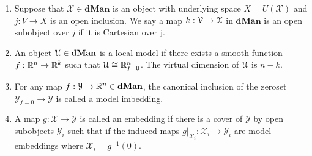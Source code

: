 \begin{defin}
    \begin{enumerate}
        \item Suppose that $\mathcal{X} \in \textbf{dMan}$ is an object with underlying space $X=U(\mathcal{X})$ and $j:V \to X$ is an open inclusion. We say a map $k:\mathcal V \to \mathcal{X}$ in $\textbf{dMan}$ is an open subobject over $j$ if it is Cartesian over j.
        \item An object $\mathcal U \in \textbf{dMan}$  is a local model if there exists a smooth function $f:\mathbb R^n \to \mathbb R^k$ such that $\mathcal U \cong \mathbb R^n_{f=0}$. The virtual dimension of $\mathcal U$ is $n-k$. 
        \item For any map $f:\mathcal{Y} \to \mathbb R^n \in \textbf{dMan}$, the canonical inclusion of the zeroset $\mathcal{Y}_{f=0} \to \mathcal{Y}$ is called a model imbedding. 
        \item A map $g:\mathcal{X} \to \mathcal{Y}$ is called an embedding if there is a cover of $\mathcal{Y}$ by open subobjects $\mathcal{Y}_i$ such that if the induced maps $g|_{\mathcal{X}_i}:\mathcal{X}_i \to \mathcal{Y}_i$ are model embeddings where $\mathcal{X}_i=g^{-1}(0)$. 
    \end{enumerate}
\end{defin}

